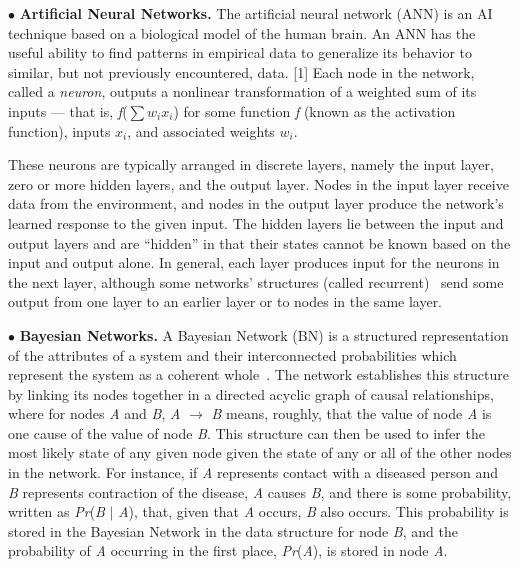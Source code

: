 \documentclass[conference]{IEEEtran}
\begin{document}
$\bullet$ {\bf Artificial Neural Networks.}
The artificial neural network (ANN) is an AI technique based on a biological model
of the human brain. An ANN has the useful ability to find patterns in empirical data
to generalize its behavior to similar, but not previously encountered, data. [1] Each
node in the network, called a \emph{neuron}, outputs a nonlinear transformation of a weighted
sum of its inputs --- that is, \emph{f}($\sum$$w_i$$x_i$) for some function \emph{f}
(known as the activation function), inputs $x_i$, and associated weights $w_i$.

These neurons are
typically arranged in discrete layers, namely the input layer, zero or more hidden
layers, and the output layer. Nodes in the input layer receive data from the
environment, and nodes in the output layer produce the network's learned response to
the given input. The hidden layers lie between the input and output layers and are
``hidden'' in that their states cannot be known based on the input and output alone. In
general, each layer produces input for the neurons in the next layer, although some
networks' structures (called recurrent)~\cite{Philips-Wren:12} send some output from one layer to an earlier layer or to nodes
in the same layer.

$\bullet$ {\bf Bayesian Networks.} A Bayesian Network (BN) is a structured representation of the attributes of a system and their interconnected probabilities which represent the system as a coherent whole~\cite{Darwiche:10}.
The network establishes this structure by linking its nodes together in a directed acyclic graph of causal relationships, where for nodes \emph{A} and \emph{B}, \emph{A} $\rightarrow$ \emph{B} means, roughly, that the value of node \emph{A} is one cause of the value of node \emph{B}.
This  structure can then be used to infer the most likely state of any given node given the state of any or all of the other  nodes in the network. For instance, if \emph{A} represents contact  with a diseased person and \emph{B} represents contraction of the  disease, \emph{A} causes \emph{B}, and there is some probability, written as \emph{Pr}(\emph{B} $|$ \emph{A}), that, given that \emph{A} occurs, \emph{B} also occurs. This probability is stored in the Bayesian Network in the data structure for node \emph{B}, and the probability of \emph{A} occurring in the first place, \emph{Pr}(\emph{A}), is stored in node \emph{A}.
\end{document}
